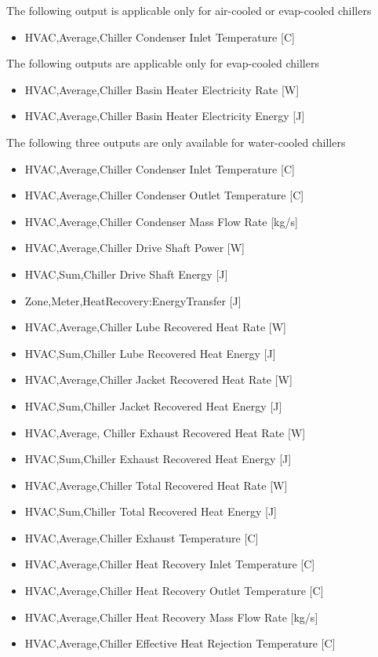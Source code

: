 The following output is applicable only for air-cooled or evap-cooled chillers

\begin{itemize}
\tightlist
\item
  HVAC,Average,Chiller Condenser Inlet Temperature {[}C{]}
\end{itemize}

The following outputs are applicable only for evap-cooled chillers

\begin{itemize}
\item
  HVAC,Average,Chiller Basin Heater Electricity Rate {[}W{]}
\item
  HVAC,Average,Chiller Basin Heater Electricity Energy {[}J{]}
\end{itemize}

The following three outputs are only available for water-cooled chillers

\begin{itemize}
\item
  HVAC,Average,Chiller Condenser Inlet Temperature {[}C{]}
\item
  HVAC,Average,Chiller Condenser Outlet Temperature {[}C{]}
\item
  HVAC,Average,Chiller Condenser Mass Flow Rate {[}kg/s{]}
\item
  HVAC,Average,Chiller Drive Shaft Power {[}W{]}
\item
  HVAC,Sum,Chiller Drive Shaft Energy {[}J{]}
\item
  Zone,Meter,HeatRecovery:EnergyTransfer {[}J{]}
\item
  HVAC,Average,Chiller Lube Recovered Heat Rate {[}W{]}
\item
  HVAC,Sum,Chiller Lube Recovered Heat Energy {[}J{]}
\item
  HVAC,Average,Chiller Jacket Recovered Heat Rate {[}W{]}
\item
  HVAC,Sum,Chiller Jacket Recovered Heat Energy {[}J{]}
\item
  HVAC,Average, Chiller Exhaust Recovered Heat Rate {[}W{]}
\item
  HVAC,Sum,Chiller Exhaust Recovered Heat Energy {[}J{]}
\item
  HVAC,Average,Chiller Total Recovered Heat Rate {[}W{]}
\item
  HVAC,Sum,Chiller Total Recovered Heat Energy {[}J{]}
\item
  HVAC,Average,Chiller Exhaust Temperature {[}C{]}
\item
  HVAC,Average,Chiller Heat Recovery Inlet Temperature {[}C{]}
\item
  HVAC,Average,Chiller Heat Recovery Outlet Temperature {[}C{]}
\item
  HVAC,Average,Chiller Heat Recovery Mass Flow Rate {[}kg/s{]}
\item
  HVAC,Average,Chiller Effective Heat Rejection Temperature {[}C{]}
\end{itemize}


